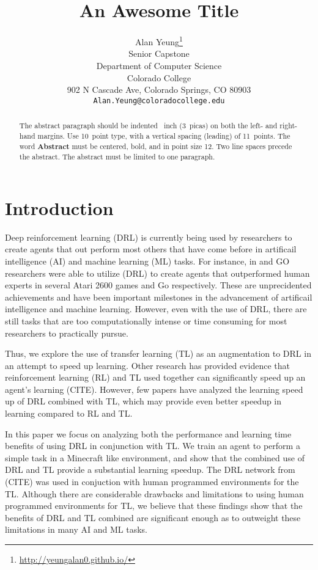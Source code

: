 \documentclass{article}
\title{An Awesome Title}
\author{
   Alan Yeung\thanks{\url{http://yeungalan0.github.io/}} \\
  Senior Capstone \\
  Department of Computer Science \\
  Colorado College \\
  902 N Cascade Ave, Colorado Springs, CO 80903 \\
  \texttt{Alan.Yeung@coloradocollege.edu} \\
}
\begin{document}

\maketitle

\begin{abstract}
  The abstract paragraph should be indented ~inch
  (3~picas) on both the left- and right-hand margins. Use 10~point
  type, with a vertical spacing (leading) of 11~points.  The word
  \textbf{Abstract} must be centered, bold, and in point size 12. Two
  line spaces precede the abstract. The abstract must be limited to
  one paragraph.
\end{abstract}

\section{Introduction}


Deep reinforcement learning (DRL) is currently being used by researchers to create agents that out perform most others that have come before in artificail intelligence (AI) and machine learning (ML) tasks.
For instance, in \citep{mnih2015human} and GO researchers were able to utilize (DRL) to create agents that outperformed human experts in several Atari 2600 games and Go respectively.
These are unprecidented achievements and have been important milestones in the advancement of artificail intelligence and machine learning.
However, even with the use of DRL, there are still tasks that are too computationally intense or time consuming for most researchers to practically pursue. 

Thus, we explore the use of transfer learning (TL) as an augmentation to DRL in an attempt to speed up learning. 
Other research has provided evidence that reinforcement learning (RL) and TL used together can significantly speed up an agent's learning (CITE). 
However, few papers have analyzed the learning speed up of DRL combined with TL, which may provide even better speedup in learning compared to RL and TL. 

In this paper we focus on analyzing both the performance and learning time benefits of using DRL in conjunction with TL. 
We train an agent to perform a simple task in a Minecraft like environment, and show that the combined use of DRL and TL provide a substantial learning speedup.
The DRL network from (CITE) was used in conjuction with human programmed environments for the TL.
Although there are considerable drawbacks and limitations to using human programmed environments for TL, we believe that these findings show that the benefits of DRL and TL combined are significant enough as to outweight these limitations in many AI and ML tasks. 
\end{document}
